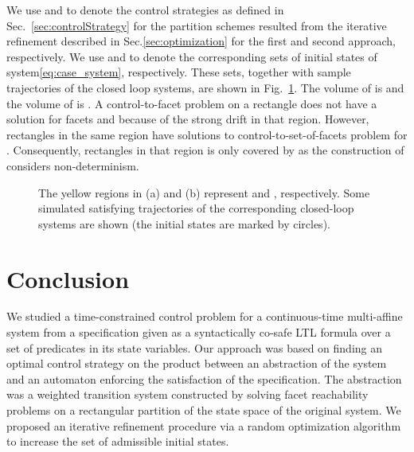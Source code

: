 \documentclass{ifacconf}
\begin{document}
We use  and  to denote the control strategies as defined in Sec.~\ref{sec:controlStrategy} for the partition schemes resulted from the iterative refinement described in Sec.\ref{sec:optimization} for the first and second approach, respectively. We use  and  to denote the corresponding sets of initial states of system\eqref{eq:case_system}, respectively. 
These sets, together with sample trajectories of the closed loop systems, are shown in Fig.~\ref{fig:sim}. 
The volume of  is  and the volume of  is . 
A control-to-facet problem on a rectangle  does not have a solution for facets  and  because of the strong drift in that region. However, rectangles in the same region have solutions to control-to-set-of-facets problem for . Consequently, rectangles in that region is only covered by  as the construction of  considers non-determinism.


\begin{figure}[h]
\centering

\caption{The yellow regions in (a) and (b) represent  and , respectively. Some simulated satisfying trajectories of the corresponding closed-loop systems are shown (the initial states are marked by circles).}
\label{fig:sim}
\end{figure}

\section{Conclusion}\label{sec:conclusion}


We studied a time-constrained control problem for a continuous-time multi-affine system from a specification given as a syntactically co-safe LTL formula over a set of predicates in its state variables. 
Our approach was based on finding an optimal control strategy on the product between an abstraction of the system and an automaton enforcing the satisfaction of the specification. The abstraction was a weighted transition system constructed by solving facet reachability problems on a rectangular partition of the state space of the original system. We proposed an iterative refinement procedure via a random optimization algorithm to increase the set of admissible initial states.
\end{document}
